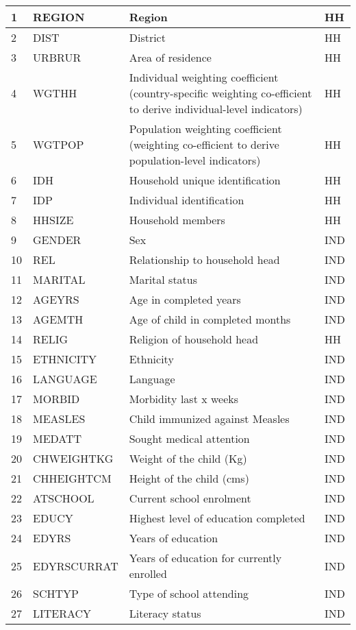 \documentclass[letterpaper,10pt,english]{sphinxmanual}
\begin{document}
\begin{savenotes}
\begin{longtable}[c]{|l|l|l|l|}
1
&
REGION
&
Region
&
HH
\\
\hline
2
&
DIST
&
District
&
HH
\\
\hline
3
&
URBRUR
&
Area of
residence
&
HH
\\
\hline
4
&
WGTHH
&
Individual
weighting
coefficient
(country-specific
weighting
co-efficient to
derive
individual-level
indicators)
&
HH
\\
\hline
5
&
WGTPOP
&
Population
weighting
coefficient
(weighting
co-efficient
to derive
population-level
indicators)
&
HH
\\
\hline
6
&
IDH
&
Household
unique
identification
&
HH
\\
\hline
7
&
IDP
&
Individual
identification
&
HH
\\
\hline
8
&
HHSIZE
&
Household
members
&
HH
\\
\hline
9
&
GENDER
&
Sex
&
IND
\\
\hline
10
&
REL
&
Relationship to
household head
&
IND
\\
\hline
11
&
MARITAL
&
Marital status
&
IND
\\
\hline
12
&
AGEYRS
&
Age in
completed years
&
IND
\\
\hline
13
&
AGEMTH
&
Age of child in
completed
months
&
IND
\\
\hline
14
&
RELIG
&
Religion of
household head
&
HH
\\
\hline
15
&
ETHNICITY
&
Ethnicity
&
IND
\\
\hline
16
&
LANGUAGE
&
Language
&
IND
\\
\hline
17
&
MORBID
&
Morbidity last
x weeks
&
IND
\\
\hline
18
&
MEASLES
&
Child immunized
against Measles
&
IND
\\
\hline
19
&
MEDATT
&
Sought medical
attention
&
IND
\\
\hline
20
&
CHWEIGHTKG
&
Weight of the
child (Kg)
&
IND
\\
\hline
21
&
CHHEIGHTCM
&
Height of the
child (cms)
&
IND
\\
\hline
22
&
ATSCHOOL
&
Current school
enrolment
&
IND
\\
\hline
23
&
EDUCY
&
Highest level
of education
completed
&
IND
\\
\hline
24
&
EDYRS
&
Years of
education
&
IND
\\
\hline
25
&
EDYRSCURRAT
&
Years of
education for
currently
enrolled
&
IND
\\
\hline
26
&
SCHTYP
&
Type of school
attending
&
IND
\\
\hline
27
&
LITERACY
&
Literacy status
&
IND
\\

\end{longtable}
\end{savenotes}
\end{document}
